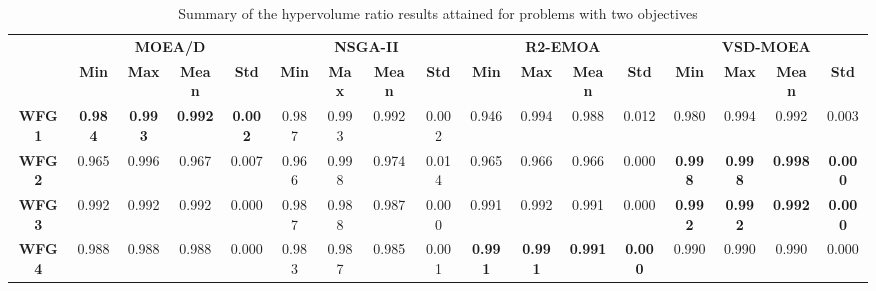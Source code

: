 \begin{table*}[t]
\caption{Summary of the hypervolume ratio results attained for problems with two objectives}
\label{tab:StatisticsHV_2obj}
\centering
\begin{scriptsize}
\begin{tabular}{cc|c|c|c|c|c|c|c|c|c|c|c|c|c|c|c}
\cline{2-17}
\textbf{}                           & \multicolumn{4}{c|}{\textbf{MOEA/D}}                              & \multicolumn{4}{c|}{\textbf{NSGA-II}}                             & \multicolumn{4}{c|}{\textbf{R2-EMOA}}                             & \multicolumn{4}{c}{\textbf{VSD-MOEA}}                            \\ \cline{2-17} 
                                    & \textbf{Min}   & \textbf{Max}   & \textbf{Mean}  & \textbf{Std}   & \textbf{Min}   & \textbf{Max}   & \textbf{Mean}  & \textbf{Std}   & \textbf{Min}   & \textbf{Max}   & \textbf{Mean}  & \textbf{Std}   & \textbf{Min}   & \textbf{Max}   & \textbf{Mean}  & \textbf{Std}   \\ \hline
\multicolumn{1}{c|}{\textbf{WFG1}}  & \textbf{0.984} & \textbf{0.993} & \textbf{0.992} & \textbf{0.002} & 0.987          & 0.993          & 0.992          & 0.002          & 0.946          & 0.994          & 0.988          & 0.012          & 0.980          & 0.994          & 0.992          & 0.003          \\ \hline
\multicolumn{1}{c|}{\textbf{WFG2}}  & 0.965          & 0.996          & 0.967          & 0.007          & 0.966          & 0.998          & 0.974          & 0.014          & 0.965          & 0.966          & 0.966          & 0.000          & \textbf{0.998} & \textbf{0.998} & \textbf{0.998} & \textbf{0.000} \\ \hline
\multicolumn{1}{c|}{\textbf{WFG3}}  & 0.992          & 0.992          & 0.992          & 0.000          & 0.987          & 0.988          & 0.987          & 0.000          & 0.991          & 0.992          & 0.991          & 0.000          & \textbf{0.992} & \textbf{0.992} & \textbf{0.992} & \textbf{0.000} \\ \hline
\multicolumn{1}{c|}{\textbf{WFG4}}  & 0.988          & 0.988          & 0.988          & 0.000          & 0.983          & 0.987          & 0.985          & 0.001          & \textbf{0.991} & \textbf{0.991} & \textbf{0.991} & \textbf{0.000} & 0.990          & 0.990          & 0.990          & 0.000          \\ \hline

\end{tabular}
\end{scriptsize}
\end{table*}
